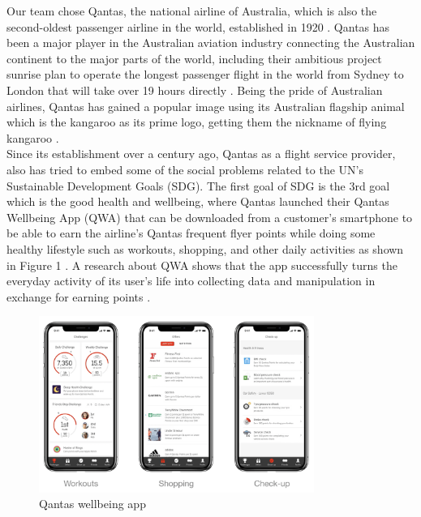 \documentclass[12pt,a4paper]{article}
\begin{document}
Our team chose Qantas, the national airline of Australia, which is also the second-oldest passenger airline in the world, established in 1920 \citep{Ref1.1}. Qantas has been a major player in the Australian aviation industry connecting the Australian continent to the major parts of the world, including their ambitious project sunrise plan to operate the longest passenger flight in the world from Sydney to London that will take over 19 hours directly \citep{Ref1.2}. Being the pride of Australian airlines, Qantas has gained a popular image using its Australian flagship animal which is the kangaroo as its prime logo, getting them the nickname of flying kangaroo \citep{Ref1.3}.\\ 

\noindent Since its establishment over a century ago, Qantas as a flight service provider, also has tried to embed some of the social problems related to the UN’s Sustainable Development Goals (SDG). The first goal of SDG is the 3rd goal which is the good health and wellbeing, where Qantas launched their Qantas Wellbeing App (QWA) that can be downloaded from a customer’s smartphone to be able to earn the airline’s Qantas frequent flyer points while doing some healthy lifestyle such as workouts, shopping, and other daily activities as shown in Figure 1 \citep{Ref1.4}. A research about QWA shows that the app successfully turns the everyday activity of its user’s life into collecting data and manipulation in exchange for earning points \citep{Ref1.5}. \\

\begin{figure}[htbp]
    \centering
    \includegraphics[width=0.8\textwidth]{images/Qantas Wellbeing App.png}
    \caption{Qantas wellbeing app \citep{Ref1.4}}
    \label{fig:example}
\end{figure}
\end{document}
